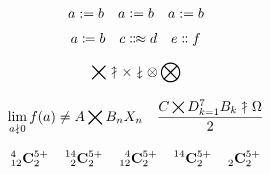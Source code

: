\documentclass{article}
\newcommand{\horz}{\noindent\makebox[\linewidth]{\rule{\paperwidth}{0.4pt}}}
\begin{document}
\horz

\[
a := b \quad
a \vcentcolon= b \quad
a \ordinarycolon= b
\]

\[
a \coloneqq b \quad c \Colonapprox d \quad e \dblcolon f
\]

\[
\bigtimes \nuparrow \times \ndownarrow \otimes \bigotimes
\]

\[
\lim_{a\ndownarrow 0} f(a) \neq A \bigtimes B_n X_n \quad
\frac{ C \bigtimes D_{k=1}^7 B_k \nuparrow \Omega }{2}
\]

\horz

\[
{}^{4}_{12}\mathbf{C}^{5+}_{2} \quad
\prescript{14}{2}{\mathbf{C}}^{5+}_{2} \quad
\prescript{4}{12}{\mathbf{C}}^{5+}_{2} \quad
\prescript{14}{}{\mathbf{C}}^{5+}_{2} \quad
\prescript{}{2}{\mathbf{C}}^{5+}_{2}
\]

\horz
\end{document}
